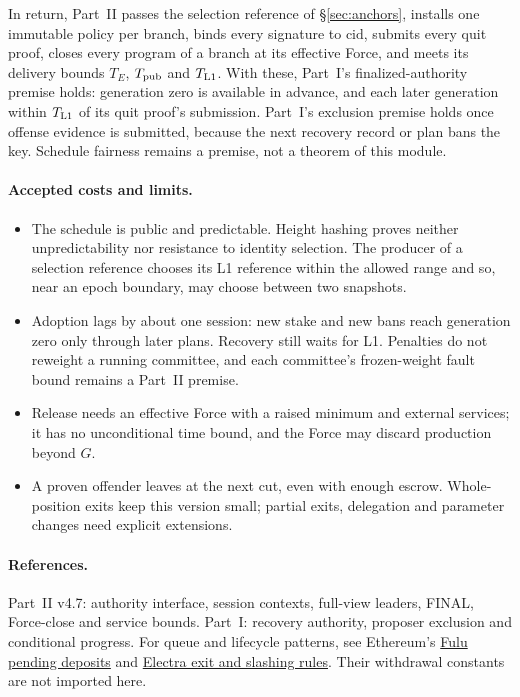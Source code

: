 \documentclass[11pt,a4paper]{article}
\newcommand{\cid}{\mathrm{cid}}
\begin{document}
In return, Part~II passes the selection reference of \S\ref{sec:anchors},
installs one immutable policy per branch, binds every signature to
$\cid$, submits every quit proof, closes every program of a branch at its
effective Force, and meets its delivery bounds $T_E$, $T_{\rm pub}$ and
$T_{\rm L1}$. With these, Part~I's finalized-authority premise holds:
generation zero is available in advance, and each later generation within
$T_{\rm L1}$ of its quit proof's submission. Part~I's exclusion premise
holds once offense evidence is submitted, because the next recovery record
or plan bans the key. Schedule fairness remains a premise, not a theorem
of this module.

\paragraph{Accepted costs and limits.}
\begin{itemize}[itemsep=3pt]
\item The schedule is public and predictable. Height hashing proves
neither unpredictability nor resistance to identity selection. The
producer of a selection reference chooses its L1 reference within the
allowed range and so, near an epoch boundary, may choose between two
snapshots.
\item Adoption lags by about one session: new stake and new bans reach
generation zero only through later plans. Recovery still waits for L1.
Penalties do not reweight a running committee, and each committee's
frozen-weight fault bound remains a Part~II premise.
\item Release needs an effective Force with a raised minimum and external
services; it has no unconditional time bound, and the Force may discard
production beyond $G$.
\item A proven offender leaves at the next cut, even with enough escrow.
Whole-position exits keep this version small; partial exits, delegation
and parameter changes need explicit extensions.
\end{itemize}

\paragraph{References.}
Part~II v4.7: authority interface, session contexts, full-view leaders,
FINAL, Force-close and service bounds.
Part~I: recovery authority, proposer exclusion and conditional progress.
For queue and lifecycle patterns, see Ethereum's
\href{https://ethereum.github.io/consensus-specs/specs/fulu/beacon-chain/}{Fulu pending deposits}
and \href{https://ethereum.github.io/consensus-specs/specs/electra/beacon-chain/}{Electra exit and slashing rules}.
Their withdrawal constants are not imported here.
\end{document}
